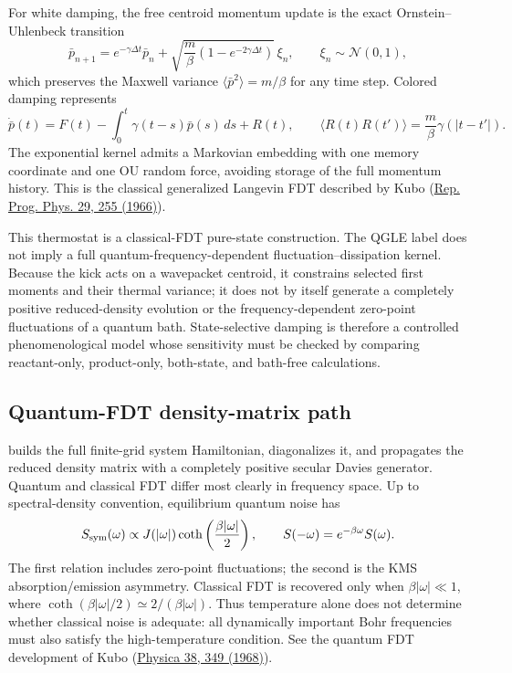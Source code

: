 \documentclass[11pt]{article}
\newcommand{\code}[1]{\texttt{\detokenize{#1}}}
\begin{document}
For white damping, the free centroid momentum update is the exact
Ornstein--Uhlenbeck transition
\begin{equation}
 \bar p_{n+1}=e^{-\gamma\Delta t}\bar p_n+
 \sqrt{\frac{m}{\beta}\left(1-e^{-2\gamma\Delta t}\right)}\,\xi_n,
 \qquad \xi_n\sim\mathcal N(0,1),
\end{equation}
which preserves the Maxwell variance $\langle\bar p^2\rangle=m/\beta$ for any
time step. Colored damping represents
\begin{equation}
 \dot{\bar p}(t)=F(t)-\int_0^t\gamma(t-s)\bar p(s)\,ds+R(t),\qquad
 \langle R(t)R(t')\rangle=\frac{m}{\beta}\gamma(|t-t'|).
\end{equation}
The exponential kernel admits a Markovian embedding with one memory coordinate and
one OU random force, avoiding storage of the full momentum history. This is the
classical generalized Langevin FDT described by Kubo
(\href{https://doi.org/10.1088/0034-4885/29/1/306}{Rep. Prog. Phys. 29, 255
(1966)}).

This thermostat is a classical-FDT pure-state construction. The QGLE label does
not imply a full quantum-frequency-dependent fluctuation--dissipation kernel.
Because the kick acts on a wavepacket centroid, it constrains selected first moments
and their thermal variance; it does not by itself generate a completely positive
reduced-density evolution or the frequency-dependent zero-point fluctuations of a
quantum bath. State-selective damping is therefore a controlled phenomenological
model whose sensitivity must be checked by comparing reactant-only, product-only,
both-state, and bath-free calculations.

\subsection{Quantum-FDT density-matrix path}

\code{quantum_fdt_density.py} builds the full finite-grid system Hamiltonian,
diagonalizes it, and propagates the reduced density matrix with a completely
positive secular Davies generator. Quantum and classical FDT differ most clearly
in frequency space. Up to spectral-density convention, equilibrium quantum noise
has
\begin{equation}
 S_{\rm sym}(\omega)\propto J(|\omega|)
 \coth\left(\frac{\beta|\omega|}{2}\right),\qquad
 S(-\omega)=e^{-\beta\omega}S(\omega).
\end{equation}
The first relation includes zero-point fluctuations; the second is the KMS
absorption/emission asymmetry. Classical FDT is recovered only when
$\beta|\omega|\ll1$, where $\coth(\beta|\omega|/2)\simeq2/(\beta|\omega|)$.
Thus temperature alone does not determine whether classical noise is adequate:
all dynamically important Bohr frequencies must also satisfy the high-temperature
condition. See the quantum FDT development of Kubo
(\href{https://doi.org/10.1016/0031-8914(68)90101-8}{Physica 38, 349 (1968)}).
\end{document}
